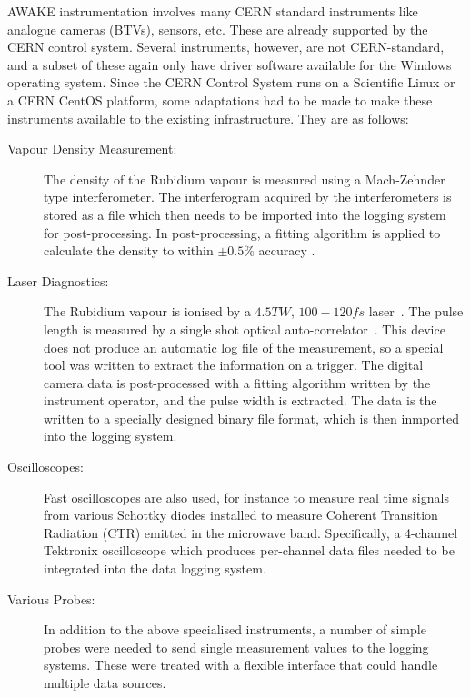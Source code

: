 AWAKE instrumentation involves many CERN standard instruments like analogue cameras (BTVs), sensors, etc.
These are already supported by the CERN control system.
Several instruments, however, are not CERN-standard, and a subset of these again only have driver software available for the Windows operating system.
Since the CERN Control System runs on a Scientific Linux or a CERN CentOS platform, some adaptations had to be made to make these instruments available to the existing infrastructure.
They are as follows:
\begin{description}
    \item[Vapour Density Measurement:]
    The density of the Rubidium vapour is measured using a Mach-Zehnder type interferometer.
    The interferogram acquired by the interferometers is stored as a file which then needs to be imported into the logging system for post-processing.
    In post-processing, a fitting algorithm is applied to calculate the density to within $\pm0.5\%$ accuracy \cite{oz:2016}.
    
    \item[Laser Diagnostics:]
    The Rubidium vapour is ionised by a $4.5\unit{TW}$, $100-120\unit{fs}$ laser~\cite{gschwendtner:2016}.
    The pulse length is measured by a single shot optical auto-correlator~\cite{salin:1987}.
    This device does not produce an automatic log file of the measurement, so a special tool was written to extract the information on a trigger.
    The digital camera data is post-processed with a fitting algorithm written by the instrument operator, and the pulse width is extracted.
    The data is the written to a specially designed binary file format, which is then inmported into the logging system.
    
    \item[Oscilloscopes:]
    Fast oscilloscopes are also used, for instance to measure real time signals from various Schottky diodes installed to measure Coherent Transition Radiation (CTR) emitted in the microwave band.
    Specifically, a 4-channel Tektronix oscilloscope which produces per-channel data files needed to be integrated into the data logging system.
    
    \item[Various Probes:]
    In addition to the above specialised instruments, a number of simple probes were needed to send single measurement values to the logging systems.
    These were treated with a flexible interface that could handle multiple data sources.
\end{description}

